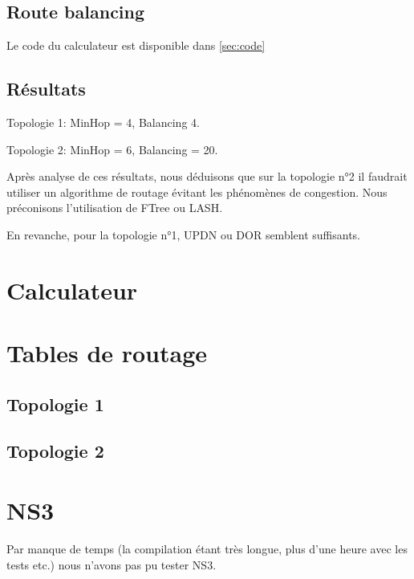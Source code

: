 \documentclass{report}
\begin{document}
			\section{Route balancing}
				Le code du calculateur est disponible dans \autoref{sec:code}
				
			\section{Résultats}
				Topologie 1: MinHop = 4, Balancing  4.
				
				Topologie 2: MinHop = 6, Balancing = 20.
				
				Après analyse de ces résultats, nous déduisons que sur la topologie n°2 il faudrait utiliser un algorithme de routage évitant les phénomènes de congestion. Nous préconisons l'utilisation de FTree ou LASH.
				
				En revanche, pour la topologie n°1, UPDN ou DOR semblent suffisants.
		
	\appendix
	\chapter{Calculateur\label{sec:code}}
		
	
	\chapter{Tables de routage\label{sec:routes}}
		\section{Topologie 1}
			
			
		\section{Topologie 2}
			
	
	\chapter{NS3}
		Par manque de temps (la compilation étant très longue, plus d'une heure avec les tests etc.) nous n'avons pas pu tester NS3.
		
\end{document}
